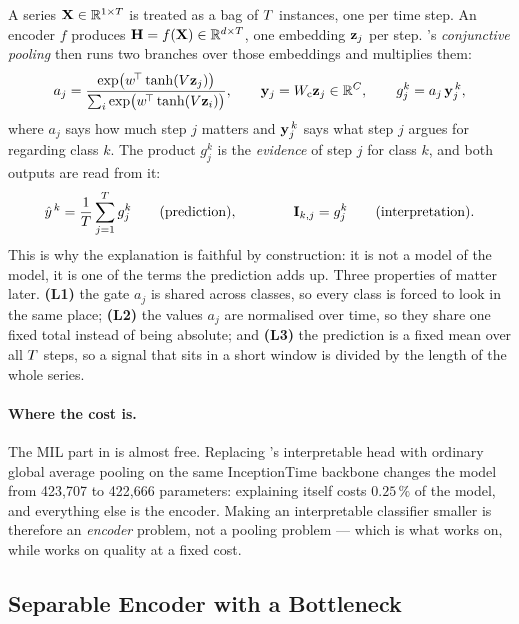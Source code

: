 A series $\mathbf{X} \in \mathbb{R}^{1 \times T}$ is treated as a bag of $T$ instances, one per time
step. An encoder $f$ produces $\mathbf{H} = f(\mathbf{X}) \in \mathbb{R}^{d \times T}$, one embedding
$\mathbf{z}_j$ per step. \millet{}'s \emph{conjunctive pooling} then runs two branches over those
embeddings and multiplies them:
\begin{equation}
  a_j = \frac{\exp\!\big(w^{\!\top}\tanh(V \mathbf{z}_j)\big)}{\sum_{i} \exp\!\big(w^{\!\top}\tanh(V \mathbf{z}_i)\big)},
  \qquad
  \mathbf{y}_j = W_{\mathrm{c}} \mathbf{z}_j \in \mathbb{R}^{C},
  \qquad
  g_j^k = a_j \, \mathbf{y}_j^{\,k},
  \label{eq:conj_gate}
\end{equation}
where $a_j$ says how much step $j$ matters and $\mathbf{y}_j^{\,k}$ says what step $j$ argues for
regarding class $k$. The product $g_j^k$ is the \emph{evidence} of step $j$ for class $k$, and both
outputs are read from it:
\begin{equation}
  \hat{y}^{\,k} = \frac{1}{T}\sum_{j=1}^{T} g_j^k
  \qquad\text{(prediction)},
  \qquad\qquad
  \mathbf{I}_{k,j} = g_j^k
  \qquad\text{(interpretation)} .
  \label{eq:conj_bag}
\end{equation}
This is why the explanation is faithful by construction: it is not a model of the model, it is one of
the terms the prediction adds up. Three properties of  matter later.
\textbf{(L1)} the gate $a_j$ is shared across classes, so every class is forced to look in the same
place; \textbf{(L2)} the values $a_j$ are normalised over time, so they share one fixed total instead
of being absolute; and \textbf{(L3)} the prediction is a fixed mean over all $T$ steps, so a
signal that sits in a short window is divided by the length of the whole series.

\paragraph{Where the cost is.}
The MIL part in  is almost free. Replacing \millet{}'s interpretable head with
ordinary global average pooling on the same InceptionTime backbone changes the model from 423{,}707
to 422{,}666 parameters: explaining itself costs $0.25\,\%$ of the model, and everything else is the
encoder. Making an interpretable classifier smaller is therefore an \emph{encoder} problem, not a
pooling problem --- which is what  works on, while  works
on quality at a fixed cost.

\subsection{Separable Encoder with a Bottleneck}
\label{sec:method:enc}

